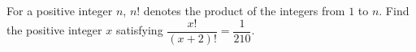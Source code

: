 For a positive integer $n$, $n!$ denotes the product of the integers from $1$ to $n$. Find the positive integer $x$ satisfying $\dfrac{x!}{(x+2)!}=\dfrac1{210}$.
